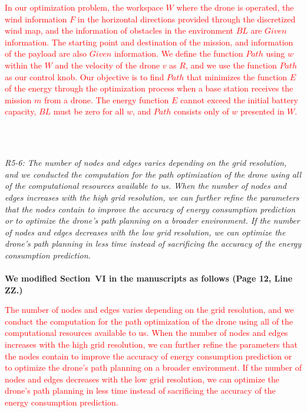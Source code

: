 \documentclass[onecolumn]{IEEEconf}
\begin{document}
\begin{description}
\begin{mdframed}[ linewidth=.75pt, userdefinedwidth=0.9\textwidth]
    \textcolor{red}{In our optimization problem, the workspace $W$ where the drone is operated, the wind information $F$ in the horizontal directions provided through the discretized wind map, and the information of obstacles in the environment $BL$ are $Given$ information.
    The starting point and destination of the mission, and information of the payload are also $Given$ information.
    We define the function $Path$ using $w$ within the $W$ and the velocity of the drone $v$ as $R$, and we use the function $Path$ as our control knob.
    Our objective is to find $Path$ that minimizes the function $E$ of the energy through the optimization process when a base station receives the mission $m$ from a drone.
    The energy function $E$ cannot exceed the initial battery capacity, $BL$ must be zero for all $w$, and $Path$ consists only of $w$ presented in $W$.}
    \end{mdframed}
    ~\\
    ~\\
	\item \textit
	{
	R5-6: The number of nodes and edges varies depending on the grid resolution, and we conducted the computation for the path optimization of the drone using all of the computational resources available to us. When the number of nodes and edges increases with the high grid resolution, we can further refine the parameters that the nodes contain to improve the accuracy of energy consumption prediction or to optimize the drone’s path planning on a broader environment.
    If the number of nodes and edges decreases with the low grid resolution, we can optimize the drone’s path planning in less time instead of sacrificing the accuracy of the energy consumption prediction.
	}
	~\\
    ~\\
    \textbf{We modified Section~VI in the manuscripts as follows (Page 12, Line ZZ.)}\\
    \begin{mdframed}[ linewidth=.75pt, userdefinedwidth=0.9\textwidth]
    \textcolor{red}{
    The number of nodes and edges varies depending on the grid resolution, and we conduct the computation for the path optimization of the drone using all of the computational resources available to us. When the number of nodes and edges increases with the high grid resolution, we can further refine the parameters that the nodes contain to improve the accuracy of energy consumption prediction or to optimize the drone’s path planning on a broader environment.
    If the number of nodes and edges decreases with the low grid resolution, we can optimize the drone’s path planning in less time instead of sacrificing the accuracy of the energy consumption prediction.}

\end{mdframed}
\end{description}
\end{document}
